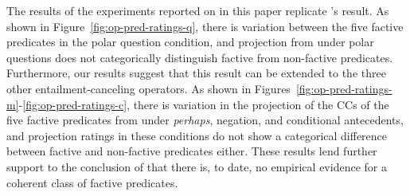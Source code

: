 \documentclass[a4paper,12pt,twoside]{article}
\newcommand{\poscite}[1]{\citeauthor{#1}'s \citeyear{#1}}
\begin{document}
        

        The results of the experiments reported on in this paper replicate \poscite{degen_are_2022} result. As shown in Figure~\ref{fig:op-pred-ratings-q}, there is variation between the five \textcolor{pred-fcv-color}{factive} predicates in the polar question condition, and projection from under polar questions does not categorically distinguish factive from non-factive predicates. Furthermore, our results suggest that this result can be extended to the three other entailment-canceling operators. As shown in Figures~\ref{fig:op-pred-ratings-m}-\ref{fig:op-pred-ratings-c}, there is variation in the projection of the CCs of the five factive predicates from under \emph{perhaps}, negation, and conditional antecedents, and projection ratings in these conditions do not show a categorical difference between factive and non-factive predicates either.  These results lend further support to the conclusion of \citealt{degen_are_2022} that there is, to date, no empirical evidence for a coherent class of factive predicates.

\end{document}
